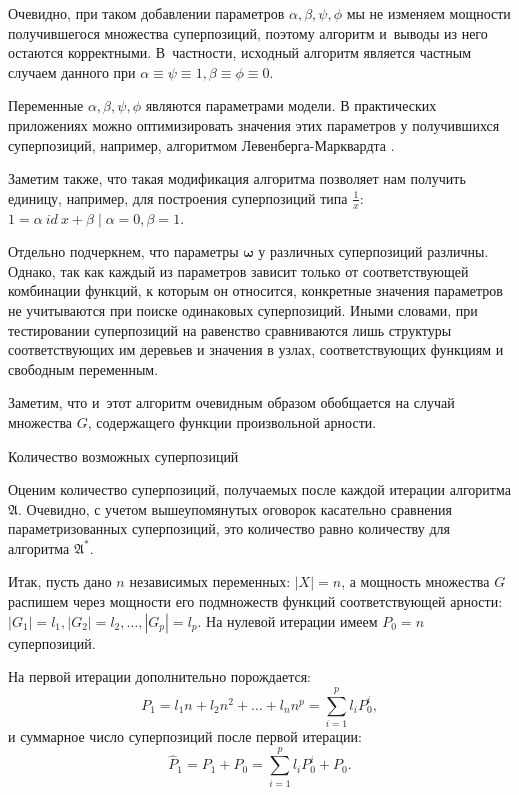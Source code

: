 \documentclass[12pt,a4paper]{article}
\makeatletter
\renewcommand{\section}{\@startsection {section}{1}
  \z@{2.7ex \@plus 1ex}{1.0ex}%
  {\normalfont}}
\makeatother
\begin{document}
Очевидно, при таком добавлении параметров $\alpha, \beta, \psi, \phi$
мы не изменяем мощности получившегося множества суперпозиций, поэтому
алгоритм и~выводы из него остаются корректными. В~частности, исходный алгоритм
является частным случаем данного при
$\alpha \equiv \psi \equiv 1, \beta \equiv \phi \equiv 0$.

Переменные $\alpha, \beta, \psi, \phi$ являются параметрами модели. В
практических приложениях можно оптимизировать значения этих параметров у
получившихся суперпозиций, например, алгоритмом Левенберга-Марквардта
\cite{Marquardt1963Algorithm, more:78}.

Заметим также, что такая модификация алгоритма позволяет нам получить единицу,
например, для построения суперпозиций типа $\frac{1}{x}$:
$1 = \alpha\ id\ x + \beta \mid \alpha = 0, \beta = 1$.

Отдельно подчеркнем, что параметры $\boldsymbol{\omega}$ у различных
суперпозиций различны. Однако, так как каждый из параметров зависит только
от соответствующей комбинации функций, к которым он относится, конкретные
значения параметров не учитываются при поиске одинаковых суперпозиций.
Иными словами, при тестировании суперпозиций на равенство сравниваются лишь
структуры соответствующих им деревьев и значения в узлах, соответствующих
функциям и свободным переменным.

Заметим, что и~этот алгоритм очевидным образом обобщается на случай
множества $G$, содержащего функции произвольной арности.

\section{Количество возможных суперпозиций}

Оценим количество суперпозиций, получаемых после каждой итерации алгоритма
$\mathfrak{A}$. Очевидно, с учетом вышеупомянутых оговорок касательно сравнения
параметризованных суперпозиций, это количество равно количеству для алгоритма
$\mathfrak{A^*}$.

Итак, пусть дано $n$ независимых переменных: $| X | = n$, а мощность
множества $G$ распишем через мощности его подмножеств функций соответствующей
арности: $| G_1 | = l_1, | G_2 | = l_2, \dots, | G_p | = l_p$. На нулевой
итерации имеем $P_0 = n$ суперпозиций.

На первой итерации дополнительно порождается:
\[
P_1 = l_1 n + l_2 n^2 + \dots + l_n n^p = \sum_{i=1}^p l_i P_0^i,
\]
и суммарное число суперпозиций после первой итерации:
\[
\hat{P}_1 = P_1 + P_0 = \sum_{i=1}^p l_i P_0^i + P_0.
\]
\end{document}
